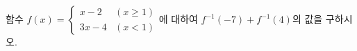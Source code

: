 함수 $f(x)=\begin{cases} x-2 & (x\ge 1) \\ 3x-4 & (x<1) \end{cases}$에 대하여 $f^{-1}(-7)+f^{-1}(4)$의 값을 구하시오.
